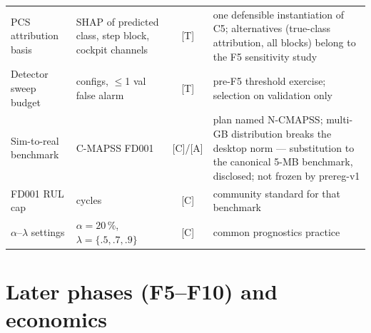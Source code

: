 \begin{center}
\begin{tabular}{>{\raggedright\arraybackslash}p{}>{\raggedright\arraybackslash}p{}c>{\raggedright\arraybackslash}p{}}
  PCS attribution basis & SHAP of predicted class, step block, cockpit channels & [T] & one defensible instantiation of C5; alternatives (true-class attribution, all blocks) belong to the F5 sensitivity study \\
  Detector sweep budget & 20 configs, $\leq$1 val false alarm & [T] & pre-F5 threshold exercise; selection on validation only \\
  Sim-to-real benchmark & C-MAPSS FD001 & [C]/[A] & plan named N-CMAPSS; multi-GB distribution breaks the desktop norm --- substitution to the canonical 5-MB benchmark, disclosed; not frozen by prereg-v1 \\
  FD001 RUL cap & 130 cycles & [C] & community standard for that benchmark \\
  $\alpha$--$\lambda$ settings & $\alpha{=}20\,\%$, $\lambda{=}\{.5,.7,.9\}$ & [C] & common
    prognostics practice \\
  \bottomrule
\end{tabular}
\end{center}

\section*{Later phases (F5--F10) and economics}

